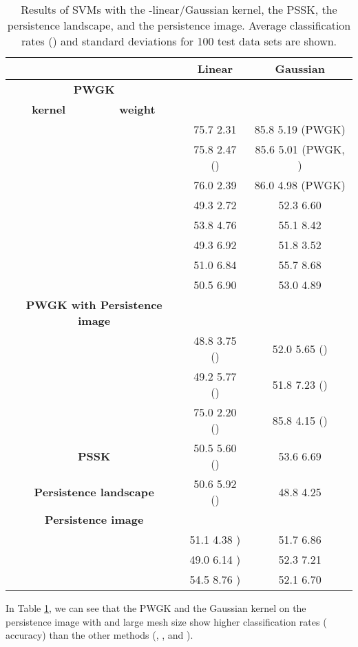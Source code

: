 \documentclass{article}
\begin{document}
\begin{table}[htbp]
\caption{Results of SVMs with the -linear/Gaussian kernel, the PSSK, the persistence landscape, and the persistence image. Average classification rates () and standard deviations for 100 test data sets are shown.}\label{table:Synth_results}
\centering
\begin{tabular}{ c  c | c | c }
\hline
\multicolumn{2}{c|}{} & Linear  & Gaussian \\ \hline
\multicolumn{2}{c|}{\textbf{PWGK}} &  	&    \\  
\textbf{kernel} & \textbf{weight} &  &  \\
			&  	&  75.7  2.31   		& 85.8  5.19 (PWGK) \\
			&  	&  75.8  2.47 ()		& 85.6  5.01 (PWGK, ) \\
   &  &  76.0  2.39		& 86.0  4.98 (PWGK) \\
			&  		&  49.3  2.72  		& 52.3  6.60  \\
			&  		&  53.8  4.76 		& 55.1  8.42 \\ \hline
			&  	&  49.3  6.92		& 51.8  3.52 \\
	&  		&  51.0  6.84		& 55.7  8.68 \\
			&  		&  50.5  6.90		& 53.0  4.89 \\ \hline
\multicolumn{2}{c|}{\textbf{PWGK with Persistence image}} &  	&    \\  
		& 	&  48.8  3.75 ()		& 52.0  5.65 () \\
		&  	&  49.2  5.77 ()		& 51.8  7.23 () \\
		&  	&  75.0  2.20 ()		& 85.8  4.15 () \\  \hline
\multicolumn{2}{c|}{\textbf{PSSK} }				&  50.5  5.60 () 	& 53.6  6.69 \\ \hline
\multicolumn{2}{c|}{\textbf{Persistence landscape}}   &   50.6  5.92 () 	& 48.8  4.25   \\  \hline
\multicolumn{2}{c|}{\textbf{Persistence image}} &  	&    \\  
		& 	 	&  51.1  4.38  )	& 51.7  6.86  \\
		& 	 	&  49.0  6.14  )	& 52.3  7.21  \\
		& 	 	&  54.5  8.76  )	& 52.1  6.70  \\ \hline
\end{tabular}
\end{table}
In Table \ref{table:Synth_results}, we can see that the PWGK  and the Gaussian kernel on the persistence image with  and large mesh size  show higher classification rates ( accuracy) than the other methods (, , and ).
\end{document}
